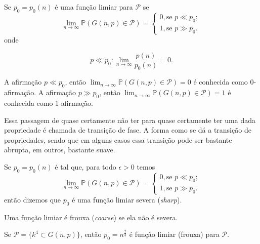 \begin{definicao}
Se $p_0 = p_0(n)$ é uma função limiar para $\mathcal{P}$ se
\begin{equation*}
    \lim_{n \rightarrow \infty} \mathbb{P}(G(n, p) \in \mathcal{P}) = \begin{cases}
    0, \text{se } p \ll p_0 ;\\
    1, \text{se } p \gg p_0.
    \end{cases}    
\end{equation*}
onde

\begin{equation*}
    p \ll p_0 : \lim_{n \rightarrow \infty} \frac{p(n)}{p_0(n)} = 0.
\end{equation*}
\end{definicao}

A afirmação $p \ll p_0$, então $\lim_{n \rightarrow \infty} \mathbb{P}(G(n, p) \in \mathcal{P}) = 0$ é conhecida como 0-afirmação. A afirmação $p \gg p_0$, então $\lim_{n \rightarrow \infty} \mathbb{P}(G(n, p) \in \mathcal{P}) = 1$ é conhecida como 1-afirmação.

Essa passagem de quase certamente não ter para quase certamente ter uma dada propriedade é chamada de transição de fase. A forma como se dá a transição de propriedades, sendo que em alguns casos essa transição pode ser bastante abrupta, em outros, bastante suave.

\begin{definicao}
Se $p_0 = p_0(n)$ é tal que, para todo $\epsilon > 0$ temos
\begin{equation*}
    \lim_{n \rightarrow \infty} \mathbb{P}(G(n, p) \in \mathcal{P}) = \begin{cases}
    0, \text{se } p \ll p_0 ;\\
    1, \text{se } p \gg p_0.
    \end{cases}    
\end{equation*}
então dizemos que $p_0$ é uma função limiar severa (\emph{sharp}).
\end{definicao}


\begin{definicao}
Uma função limiar é frouxa (\emph{coarse}) se ela não é severa.
\end{definicao}

\begin{exemplo}
Se $\mathcal{P} = \{k ^4 \subset G(n,p)\}$, então $p_0 = n^{\frac{2}{3}}$ é função limiar (frouxa) para $\mathcal{P}$.
\end{exemplo}

